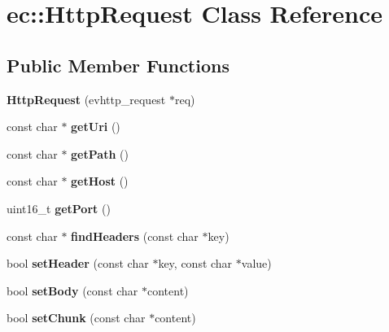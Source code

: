 \hypertarget{classec_1_1HttpRequest}{\section{ec\-:\-:Http\-Request Class Reference}
\label{classec_1_1HttpRequest}
}
\subsection*{Public Member Functions}
\begin{DoxyCompactItemize}
\item 
\hypertarget{classec_1_1HttpRequest_a7e03a8dbd2c3d2dc246161a52b6bca1a}{{\bfseries Http\-Request} (evhttp\-\_\-request $\ast$req)}\label{classec_1_1HttpRequest_a7e03a8dbd2c3d2dc246161a52b6bca1a}

\item 
\hypertarget{classec_1_1HttpRequest_ae135b819e4d9bfe1cc63575fb631b233}{const char $\ast$ {\bfseries get\-Uri} ()}\label{classec_1_1HttpRequest_ae135b819e4d9bfe1cc63575fb631b233}

\item 
\hypertarget{classec_1_1HttpRequest_add8ee458271cb64ed7ed1550c72bf227}{const char $\ast$ {\bfseries get\-Path} ()}\label{classec_1_1HttpRequest_add8ee458271cb64ed7ed1550c72bf227}

\item 
\hypertarget{classec_1_1HttpRequest_a5fba94bacedc26ea529f348a43fa3202}{const char $\ast$ {\bfseries get\-Host} ()}\label{classec_1_1HttpRequest_a5fba94bacedc26ea529f348a43fa3202}

\item 
\hypertarget{classec_1_1HttpRequest_a0bfefdeb157004726da762f1a67a248d}{uint16\-\_\-t {\bfseries get\-Port} ()}\label{classec_1_1HttpRequest_a0bfefdeb157004726da762f1a67a248d}

\item 
\hypertarget{classec_1_1HttpRequest_a4ee1d9a06f26bce0e7b666e478781885}{const char $\ast$ {\bfseries find\-Headers} (const char $\ast$key)}\label{classec_1_1HttpRequest_a4ee1d9a06f26bce0e7b666e478781885}

\item 
\hypertarget{classec_1_1HttpRequest_aa3f4b050dac178d69813cdfd2b26f454}{bool {\bfseries set\-Header} (const char $\ast$key, const char $\ast$value)}\label{classec_1_1HttpRequest_aa3f4b050dac178d69813cdfd2b26f454}

\item 
\hypertarget{classec_1_1HttpRequest_a360ff2ba5968126d03ff647b3032784e}{bool {\bfseries set\-Body} (const char $\ast$content)}\label{classec_1_1HttpRequest_a360ff2ba5968126d03ff647b3032784e}

\item 
\hypertarget{classec_1_1HttpRequest_a84830ca91e3fd9080ff06fd5a5c89f96}{bool {\bfseries set\-Chunk} (const char $\ast$content)}\label{classec_1_1HttpRequest_a84830ca91e3fd9080ff06fd5a5c89f96}

\end{DoxyCompactItemize}
